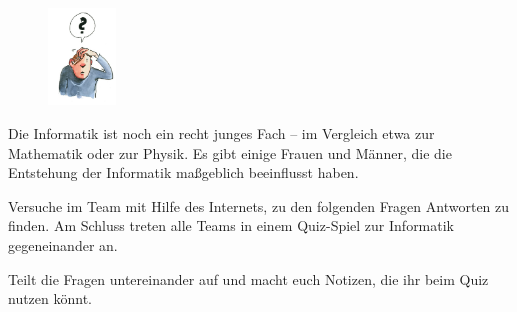 \documentclass[11pt, a4paper, ngerman]{arbeitsblatt}
\begin{document}
\ReiheTitel

\begin{figure}
\includegraphics[width=1.8cm]{9Diff-AB.1-Abb-1}
\end{figure}
Die Informatik ist noch ein recht junges Fach – im Vergleich etwa zur Mathematik oder zur Physik.
Es gibt einige Frauen und Männer, die die Entstehung der Informatik maßgeblich beeinflusst haben.


Versuche im Team mit Hilfe des Internets, zu den folgenden Fragen Antworten zu finden. Am Schluss treten
alle Teams in einem Quiz-Spiel zur Informatik gegeneinander an.


Teilt die Fragen untereinander auf und macht euch Notizen, die ihr beim Quiz nutzen könnt.
\end{document}
